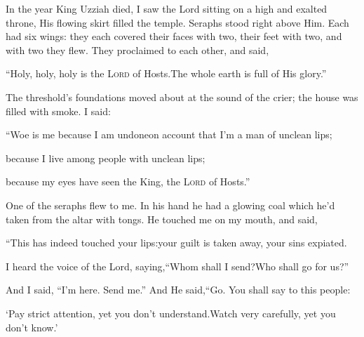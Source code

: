 
\begin{inparaenum}
   In the year King Uzziah died, I saw the Lord sitting on a high and exalted throne, His flowing skirt filled the temple.%
   Seraphs stood right above Him. Each had six wings: they each covered their faces with two, their feet with two, and with two they flew.%
   They proclaimed to each other, and said,\smallskip%
  
  \pc ``Holy, holy, holy is the \textsc{Lord} of Hosts.\pa The whole earth is full of His glory.''\smallskip%
  
  \noindent{} The threshold's foundations moved about at the sound of the crier; the house was filled with smoke.%
   I said:\smallskip%
  
  \pc ``Woe is me because I am undone\pa on account that I'm a man of unclean lips;%
  
  \pc because I live among people with unclean lips;%
  
  \pc because my eyes have seen the King, the \textsc{Lord} of Hosts.''\smallskip%
  
  \noindent{} One of the seraphs flew to me. In his hand he had a glowing coal which he'd taken from the altar with tongs.%
   He touched me on my mouth,%
  and said,\smallskip%
  
  \pc ``This has indeed touched your lips:\pa your guilt is taken away, your sins expiated.%
  
  \pa {} I heard the voice of the Lord, saying,\pa ``Whom shall I send?\pa Who shall go for us?''%
  
  \pa And I said, ``I'm here.%
  Send me.''\pa {} And He said,\pa ``Go. You shall say to this people:%
  
  \pc `Pay strict attention, yet you don't understand.\pa Watch very carefully, yet you don't know.'%
  

\end{inparaenum}
